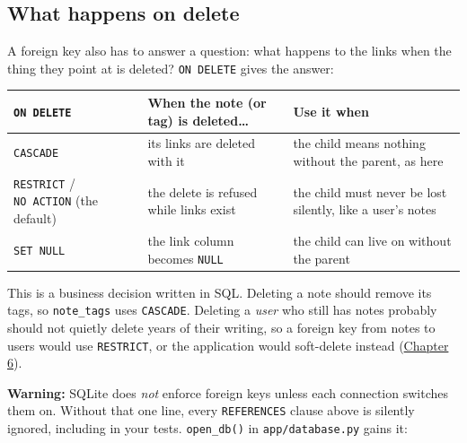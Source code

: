 \subsection*{What happens on delete}\label{33-logic-execution:what-happens-on-delete}

A foreign key also has to answer a question: what happens to the links when the thing they point at is deleted? \texttt{ON\ DELETE} gives the answer:


{\def\LTcaptype{none} %
\begin{longtable}[]{@{}
  >{\raggedright\arraybackslash}p{}
  >{\raggedright\arraybackslash}p{}
  >{\raggedright\arraybackslash}p{}@{}}
\toprule\noalign{}
\begin{minipage}[b]{\linewidth}\raggedright
\texttt{ON\ DELETE}
\end{minipage} & \begin{minipage}[b]{\linewidth}\raggedright
When the note (or tag) is deleted\ldots{}
\end{minipage} & \begin{minipage}[b]{\linewidth}\raggedright
Use it when
\end{minipage} \\
\midrule\noalign{}
\endhead
\bottomrule\noalign{}
\endlastfoot
\texttt{CASCADE} & its links are deleted with it & the child means nothing without the parent, as here \\
\texttt{RESTRICT} / \texttt{NO\ ACTION} (the default) & the delete is refused while links exist & the child must never be lost silently, like a user's notes \\
\texttt{SET\ NULL} & the link column becomes \texttt{NULL} & the child can live on without the parent \\
\end{longtable}
}

This is a business decision written in SQL. Deleting a note should remove its tags, so \texttt{note\_tags} uses \texttt{CASCADE}. Deleting a \emph{user} who still has notes probably should not quietly delete years of their writing, so a foreign key from notes to users would use \texttt{RESTRICT}, or the application would soft-delete instead (\hyperref[ch:06-local-dependencies]{Chapter 6}).

\begin{warnbox}

\textbf{Warning:} SQLite does \emph{not} enforce foreign keys unless each connection switches them on. Without that one line, every \texttt{REFERENCES} clause above is silently ignored, including in your tests. \texttt{open\_db()} in \texttt{app/database.py} gains it:

\end{warnbox}

